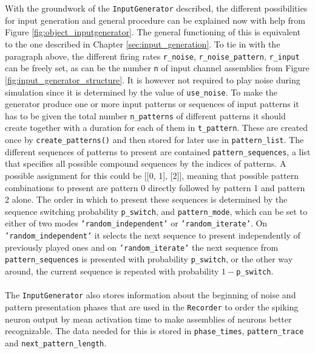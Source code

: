 \\ \ \\
With the groundwork of the \texttt{InputGenerator} described, the different possibilities for input generation and general procedure can be explained now with help from Figure \ref{fig:object_inputgenerator}. The general functioning of this is equivalent to the one described in Chapter \ref{sec:input_generation}. To tie in with the paragraph above, the different firing rates \texttt{r\_noise}, \texttt{r\_noise\_pattern}, \texttt{r\_input} can be freely set, as can be the number \texttt{n} of input channel assemblies from Figure \ref{fig:input_generator_structure}. It is however not required to play noise during simulation since it is determined by the value of \texttt{use\_noise}. To make the generator produce one or more input patterns or sequences of input patterns it has to be given the total number \texttt{n\_patterns} of different patterns it should create together with a duration for each of them in \texttt{t\_pattern}. These are created once by \texttt{create\_patterns()} and then stored for later use in \texttt{pattern\_list}.
The different sequences of patterns to present are contained \texttt{pattern\_sequences}, a list that specifies all possible compound sequences by the indices of patterns. A possible assignment for this could be [[0, 1], [2]], meaning that possible pattern combinations to present are pattern 0 directly followed by pattern 1 and pattern 2 alone. The order in which to present these sequences is determined by the sequence switching probability \texttt{p\_switch}, and \texttt{pattern\_mode}, which can be set to either of two modes \texttt{'random\_independent'} or \texttt{'random\_iterate'}. On \texttt{'random\_independent'} it selects the next sequence to present independently of previously played ones and on \texttt{'random\_iterate'} the next sequence from \texttt{pattern\_sequences} is presented with probability \texttt{p\_switch}, or the other way around, the current sequence is repeated with probability $1-$\texttt{p\_switch}.
\\ \ \\
The \texttt{InputGenerator} also stores information about the beginning of noise and pattern presentation phases that are used in the \texttt{Recorder} to order the spiking neuron output by mean activation time to make assemblies of neurons better recognizable. The data needed for this is stored in \texttt{phase\_times}, \texttt{pattern\_trace} and \texttt{next\_pattern\_length}.

